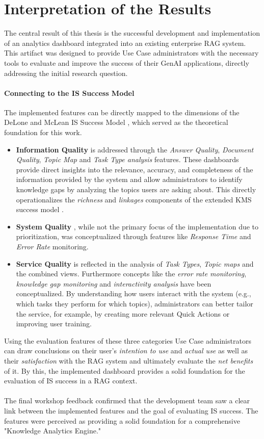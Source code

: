 \documentclass[
	english,
	ruledheaders=section,%
	class=report,%
	thesis={type=bachelor},%
	accentcolor=1b,%
	custommargins=true,%
	marginpar=false,%
	parskip=half-,%
	fontsize=11pt,%
	DIV=14,
]{tudapub}
\begin{document}
\section{Interpretation of the Results}
The central result of this thesis is the successful development and implementation of an analytics dashboard integrated into an existing enterprise RAG system. This artifact was designed to provide Use Case administrators with the necessary tools to evaluate and improve the success of their GenAI applications, directly addressing the initial research question.

\paragraph{Connecting to the IS Success Model} The implemented features can be directly mapped to the dimensions of the DeLone and McLean IS Success Model \parencite{DeloneMcLean2003ISSuccessTenYearUpdate}, which served as the theoretical foundation for this work.
\begin{itemize}
    \item \textbf{Information Quality} is addressed through the \textit{Answer Quality}, \textit{Document Quality}, \textit{Topic Map} and \textit{Task Type analysis} features. These dashboards provide direct insights into the relevance, accuracy, and completeness of the information provided by the system and allow administrators to identify knowledge gaps by analyzing the topics users are asking about. This directly operationalizes the \textit{richness} and \textit{linkages} components of the extended KMS success model \parencite[pp.~57--58]{Jennex2006}.
    \item \textbf{System Quality} \parencite[p.~64]{DeloneMcLean1992ISSuccess}, while not the primary focus of the implementation due to prioritization, was conceptualized through features like \textit{Response Time} and \textit{Error Rate} monitoring.
    \item \textbf{Service Quality} is reflected in the analysis of \textit{Task Types}, \textit{Topic maps} and the combined views. Furthermore concepts like the \textit{error rate monitoring}, \textit{knowledge gap monitoring} and \textit{interactivity analysis} have been conceptualized. By understanding how users interact with the system (e.g., which tasks they perform for which topics), administrators can better tailor the service, for example, by creating more relevant Quick Actions or improving user training.
\end{itemize}
Using the evaluation features of these three categories Use Case administrators can draw conclusions on their user's \textit{intention to use} and \textit{actual use}  as well as their \textit{satisfaction} with the RAG system and ultimately evaluate the \textit{net benefits} of it. By this, the implemented dashboard provides a solid foundation for the evaluation of IS success in a RAG context.\\
\\
The final workshop feedback confirmed that the development team saw a clear link between the implemented features and the goal of evaluating IS success. The features were perceived as providing a solid foundation for a comprehensive "Knowledge Analytics Engine."
\end{document}
